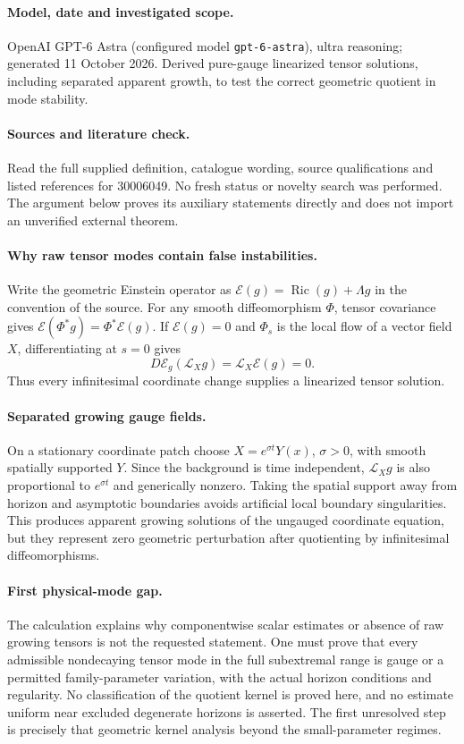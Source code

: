 \documentclass[11pt]{article}
\begin{document}
\paragraph{Model, date and investigated scope.}
OpenAI GPT-6 Astra (configured model \texttt{gpt-6-astra}), ultra reasoning; generated 11 October 2026. Derived pure-gauge linearized tensor solutions, including separated apparent growth, to test the correct geometric quotient in mode stability.

\paragraph{Sources and literature check.}
Read the full supplied definition, catalogue wording, source qualifications and listed references for 30006049. No fresh status or novelty search was performed. The argument below proves its auxiliary statements directly and does not import an unverified external theorem.

\paragraph{Why raw tensor modes contain false instabilities.} Write the geometric Einstein operator as \(\mathcal E(g)=\operatorname{Ric}(g)+\Lambda g\) in the convention of the source. For any smooth diffeomorphism \(\Phi\), tensor covariance gives \(\mathcal E(\Phi^*g)=\Phi^*\mathcal E(g)\). If \(\mathcal E(g)=0\) and \(\Phi_s\) is the local flow of a vector field \(X\), differentiating at \(s=0\) gives
\[
 D\mathcal E_g(\mathcal L_Xg)=\mathcal L_X\mathcal E(g)=0.
\]
Thus every infinitesimal coordinate change supplies a linearized tensor solution.
\paragraph{Separated growing gauge fields.} On a stationary coordinate patch choose \(X=e^{\sigma t}Y(x)\), \(\sigma>0\), with smooth spatially supported \(Y\). Since the background is time independent, \(\mathcal L_Xg\) is also proportional to \(e^{\sigma t}\) and generically nonzero. Taking the spatial support away from horizon and asymptotic boundaries avoids artificial local boundary singularities. This produces apparent growing solutions of the ungauged coordinate equation, but they represent zero geometric perturbation after quotienting by infinitesimal diffeomorphisms.
\paragraph{First physical-mode gap.} The calculation explains why componentwise scalar estimates or absence of raw growing tensors is not the requested statement. One must prove that every admissible nondecaying tensor mode in the full subextremal range is gauge or a permitted family-parameter variation, with the actual horizon conditions and regularity. No classification of the quotient kernel is proved here, and no estimate uniform near excluded degenerate horizons is asserted. The first unresolved step is precisely that geometric kernel analysis beyond the small-parameter regimes.
\end{document}
